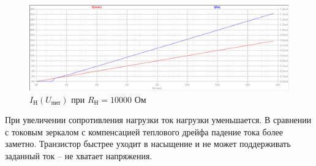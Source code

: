 \documentclass[a4paper, 12pt]{article}
\begin{document}
    \begin{figure}[H]
        \centering
        \includegraphics[scale=0.46]{2task_Iн(Vпит)_Rн10000.png}
        \captionsetup{skip=0pt}
        \caption{$I_\text{Н}\left( U_\text{пит} \right)$ при $R_\text{Н}=10000$ Ом}
        \label{fig:2task_InVlR10000}
    \end{figure}
    \noindent При увеличении сопротивления нагрузки ток нагрузки уменьшается.
    В сравнении с токовым зеркалом с компенсацией теплового дрейфа падение тока более заметно.
    Транзистор быстрее уходит в насыщение и не может поддерживать заданный ток -- не хватает напряжения.
\end{document}
